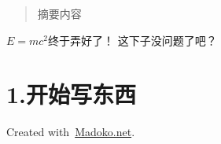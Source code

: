 \documentclass{article}
\begin{document}
\mdxtitleblockstart{}
\mdxauthorstart{}
\mdxauthorend\mdtitleauthorrunning{}{}\mdxtitleblockend%

\begin{abstract}%

\noindent{}摘要内容%
\end{abstract}%

\noindent{}$E = mc^2$终于弄好了！\mdbr
{}这下子没问题了吧？ %

\section{1.\hspace*{0.5em}开始写东西}\label{section}%

\begin{mdbmargintb}{4em}{}%
\begin{mdflushright}%
{\tiny{}Created with~\href{https://www.madoko.net}{Madoko.net}.}%
\end{mdflushright}%
\end{mdbmargintb}%
\end{document}
